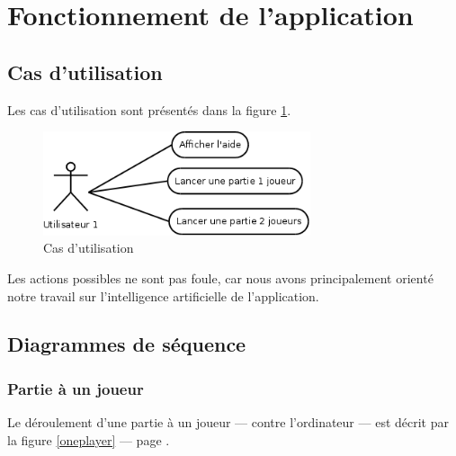 \documentclass[11pt,a4paper,titlepage,french]{article}
\begin{document}
	\section{Fonctionnement de l'application}

		\subsection{Cas d'utilisation}
			Les cas d'utilisation sont présentés dans la figure \ref{use case}.

			\begin{figure}[ohbt]
				\begin{center}
					\includegraphics[width=0.7\textwidth]{./usecase.png}
				\end{center}
				\caption{Cas d'utilisation}
				\label{use case}
			\end{figure}

		Les actions possibles ne sont pas foule, car nous avons principalement orienté notre travail sur l'intelligence artificielle de l'application.

		\subsection{Diagrammes de séquence}

			\subsubsection{Partie à un joueur}
				Le déroulement d'une partie à un joueur --- contre l'ordinateur --- est décrit par la figure \ref{oneplayer} --- page \pageref{oneplayer}.
\end{document}
